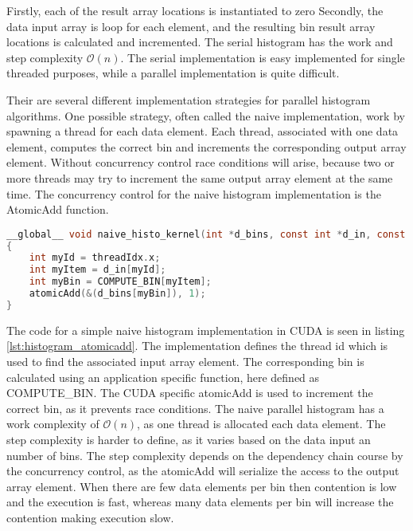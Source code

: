 Firstly, each of the result array locations is instantiated to zero Secondly, the data input array is loop for each element, and the resulting bin result array locations is calculated and incremented. The serial histogram has the work and step complexity $\mathcal{O}(n)$. The serial implementation is easy implemented for single threaded purposes, while a parallel implementation is quite difficult.

Their are several different implementation strategies for parallel histogram algorithms. One possible strategy, often called the naive implementation, work by spawning a thread for each data element. Each thread, associated with one data element, computes the correct bin and increments the corresponding output array element. Without concurrency control race conditions will arise, because two or more threads may try to increment the same output array element at the same time. The concurrency control for the naive histogram implementation is the AtomicAdd function.

\begin{lstlisting}[language=C,caption={TBD},label=lst:histogram_atomicadd]
__global__ void naive_histo_kernel(int *d_bins, const int *d_in, const int BIN_COUNT)
{
	int myId = threadIdx.x;
	int myItem = d_in[myId];
	int myBin = COMPUTE_BIN[myItem];
	atomicAdd(&(d_bins[myBin]), 1);
}
\end{lstlisting}

The code for a simple naive histogram implementation in CUDA is seen in listing \ref{lst:histogram_atomicadd}. The implementation defines the thread id which is used to find the associated input array element. The corresponding bin is calculated using an application specific function, here defined as COMPUTE\_BIN. The CUDA specific atomicAdd is used to increment the correct bin, as it prevents race conditions. The naive parallel histogram has a work complexity of $\mathcal{O}(n)$, as one thread is allocated each data element. The step complexity is harder to define, as it varies based on the data input an number of bins. The step complexity depends on the dependency chain course by the concurrency control, as the atomicAdd will serialize the access to the output array element. When there are few data elements per bin then contention is low and the execution is fast, whereas many data elements per bin will increase the contention making execution slow.  



           